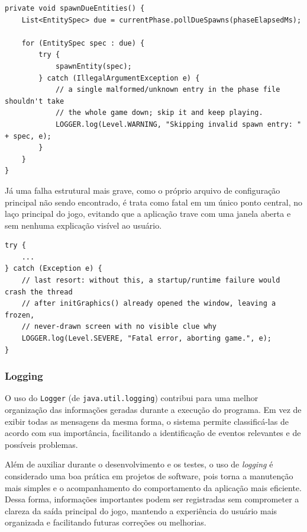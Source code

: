 \begin{lstlisting}[caption={Uma entrada inválida não derruba a fase inteira (Game.java)}]
private void spawnDueEntities() {
    List<EntitySpec> due = currentPhase.pollDueSpawns(phaseElapsedMs);

    for (EntitySpec spec : due) {
        try {
            spawnEntity(spec);
        } catch (IllegalArgumentException e) {
            // a single malformed/unknown entry in the phase file shouldn't take
            // the whole game down; skip it and keep playing.
            LOGGER.log(Level.WARNING, "Skipping invalid spawn entry: " + spec, e);
        }
    }
}
\end{lstlisting}

Já uma falha estrutural mais grave, como o próprio arquivo de configuração
principal não sendo encontrado, é trata como fatal em um único ponto
central, no laço principal do jogo, evitando que a aplicação trave com uma
janela aberta e sem nenhuma explicação visível ao usuário.

\begin{lstlisting}[caption={Falhas fatais são registradas e encerram o jogo (Game.java)}]
try {
    ...
} catch (Exception e) {
    // last resort: without this, a startup/runtime failure would crash the thread
    // after initGraphics() already opened the window, leaving a frozen,
    // never-drawn screen with no visible clue why
    LOGGER.log(Level.SEVERE, "Fatal error, aborting game.", e);
}
\end{lstlisting}

\subsubsection{Logging}

O uso do \texttt{Logger} (de \texttt{java.util.logging}) contribui para uma melhor
organização das informações geradas durante a execução do programa. Em vez de
exibir todas as mensagens da mesma forma, o sistema permite classificá-las de
acordo com sua importância, facilitando a identificação de eventos relevantes e
de possíveis problemas.

Além de auxiliar durante o desenvolvimento e os testes, o uso de \textit{logging}
é considerado uma boa prática em projetos de software, pois torna a manutenção
mais simples e o acompanhamento do comportamento da aplicação mais eficiente.
Dessa forma, informações importantes podem ser registradas sem comprometer a
clareza da saída principal do jogo, mantendo a experiência do usuário mais
organizada e facilitando futuras correções ou melhorias.
